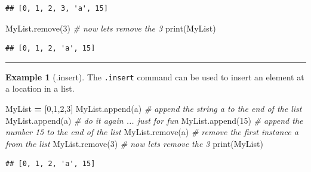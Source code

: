 \documentclass[
]{book}
\newenvironment{Shaded}{\begin{snugshade}}{\end{snugshade}}
\newcommand{\BuiltInTok}[1]{#1}
\newcommand{\CommentTok}[1]{\textcolor[rgb]{0.56,0.35,0.01}{\textit{#1}}}
\newcommand{\DecValTok}[1]{\textcolor[rgb]{0.00,0.00,0.81}{#1}}
\newcommand{\NormalTok}[1]{#1}
\newcommand{\OperatorTok}[1]{\textcolor[rgb]{0.81,0.36,0.00}{\textbf{#1}}}
\newcommand{\StringTok}[1]{\textcolor[rgb]{0.31,0.60,0.02}{#1}}
\theoremstyle{definition}
\theoremstyle{definition}
\newtheorem{example}{Example}[chapter]
\theoremstyle{definition}
\theoremstyle{remark}
\begin{document}
\begin{verbatim}
## [0, 1, 2, 3, 'a', 15]
\end{verbatim}

\begin{Shaded}
\begin{Highlighting}[]
\NormalTok{MyList.remove(}\DecValTok{3}\NormalTok{) }\CommentTok{\# now let\textquotesingle{}s remove the 3}
\BuiltInTok{print}\NormalTok{(MyList)}
\end{Highlighting}
\end{Shaded}

\begin{verbatim}
## [0, 1, 2, 'a', 15]
\end{verbatim}

\begin{center}\rule{0.5\linewidth}{0.5pt}\end{center}

\begin{example}[.insert]
\protect\hypertarget{exm:unnamed-chunk-649}{}{\label{exm:unnamed-chunk-649} {} }The \texttt{.insert} command can be used to insert an element at a location in a list.
\end{example}

\begin{Shaded}
\begin{Highlighting}[]
\NormalTok{MyList }\OperatorTok{=}\NormalTok{ [}\DecValTok{0}\NormalTok{,}\DecValTok{1}\NormalTok{,}\DecValTok{2}\NormalTok{,}\DecValTok{3}\NormalTok{]}
\NormalTok{MyList.append(}\StringTok{\textquotesingle{}a\textquotesingle{}}\NormalTok{) }\CommentTok{\# append the string \textquotesingle{}a\textquotesingle{} to the end of the list}
\NormalTok{MyList.append(}\StringTok{\textquotesingle{}a\textquotesingle{}}\NormalTok{) }\CommentTok{\# do it again ... just for fun}
\NormalTok{MyList.append(}\DecValTok{15}\NormalTok{) }\CommentTok{\# append the number 15 to the end of the list}
\NormalTok{MyList.remove(}\StringTok{\textquotesingle{}a\textquotesingle{}}\NormalTok{) }\CommentTok{\# remove the first instance \textasciigrave{}a\textasciigrave{} from the list}
\NormalTok{MyList.remove(}\DecValTok{3}\NormalTok{) }\CommentTok{\# now let\textquotesingle{}s remove the 3}
\BuiltInTok{print}\NormalTok{(MyList)}
\end{Highlighting}
\end{Shaded}

\begin{verbatim}
## [0, 1, 2, 'a', 15]
\end{verbatim}
\end{document}
